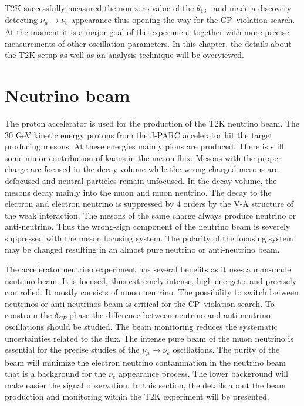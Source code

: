 \documentclass[../main.tex]{subfiles}
\begin{document}
T2K successfully measured the non-zero value of the $\theta_{13}$~\cite{Abe2014a, An2012} and made a discovery detecting $\nu_\mu\to\nu_e$ appearance thus opening the way for the CP--violation search. At the moment it is a major goal of the experiment together with more precise measurements of other oscillation parameters. In this chapter, the details about the T2K setup as well as an analysis technique will be overviewed.

\section{Neutrino beam}
\label{ch:T2K:nu_beam}

The proton accelerator is used for the production of the T2K neutrino beam. The 30 GeV kinetic energy protons from the J-PARC accelerator hit the target producing mesons. At these energies mainly pions are produced. There is still some minor contribution of kaons in the meson flux. Mesons with the proper charge are focused in the decay volume while the wrong-charged mesons are defocused and neutral particles remain unfocused. In the decay volume, the mesons decay mainly into the muon and muon neutrino. The decay to the electron and electron neutrino is suppressed by 4 orders by the V-A structure of the weak interaction. The mesons of the same charge always produce neutrino or anti-neutrino. Thus the wrong-sign component of the neutrino beam is severely suppressed with the meson focusing system. The polarity of the focusing system may be changed resulting in an almost pure neutrino or anti-neutrino beam.

The accelerator neutrino experiment has several benefits as it uses a man-made neutrino beam. It is focused, thus extremely intense, high energetic and precisely controlled. It mostly consists of muon neutrino. The possibility to switch between neutrinos or anti-neutrinos beam is critical for the CP--violation search. To constrain the $\delta_{CP}$ phase the difference between neutrino and anti-neutrino oscillations should be studied. The beam monitoring reduces the systematic uncertainties related to the flux. The intense pure beam of the muon neutrino is essential for the precise studies of the $\nu_\mu\to\nu_e$ oscillations. The purity of the beam will minimize the electron neutrino contamination in the neutrino beam that is a background for the $\nu_e$ appearance process. The lower background will make easier the signal observation. In this section, the details about the beam production and monitoring within the T2K experiment will be presented.
\end{document}
